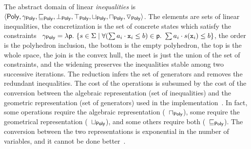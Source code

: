 \documentclass{llncs}
\begin{document}
The abstract domain of linear \emph{inequalities} is   $\langle \mathsf{Poly}, \gamma_{\mathsf{Poly}},\allowbreak {\ensuremath{\sqsubseteq}}_{\mathsf{Poly}}, {\bot}_{\mathsf{Poly}}, \allowbreak {\ensuremath{\top}}_{\mathsf{Poly}}, {\sqcup}_{\mathsf{Poly}}, {\sqcap}_{\mathsf{Poly}}, \triangledown_{\mathsf{Poly}} \rangle$.
The elements are sets of linear inequalities, the concretization is the set of concrete states which satisfy the constraints 
 \ie\ $\gamma_{\mathsf{Poly}} = \lambda \mathsf{\mathsf{p}}.\ \{ s \in \Sigma \mid \forall (\sum a_i \cdot \mathtt{x}_i \leq b) \in \mathsf{\mathsf{p}}.\ \sum a_i \cdot s(\mathtt{x}_i) \leq b  \} $, the order is the polyhedron inclusion, the bottom is the empty polyhedron, the top is the whole space, the join is the convex hull, the meet is just the union of the set of constraints, and the widening preserves the inequalities stable  among two successive iterations.
The reduction infers the set of generators  and removes the redundant inequalities.
The cost of the \Polyhedra{} operations is subsumed by the cost of the conversion between the algebraic representation (set of inequalities) and the geometric representation (set of generators) used in the implementation~\cite{PPL}.
In fact, some operations  require the algebraic representation  (\eg\ ${\sqcap}_{\mathsf{Poly}}$), some require the geometrical representation (\eg\ ${\sqcup}_{\mathsf{Poly}}$), and some others require both (\eg\ ${\sqsubseteq}_{\mathsf{Poly}}$).
The conversion between the two representations is exponential in the number of variables, and it cannot be done better~\cite{KhachiyanBBEG06}.


\end{document}
